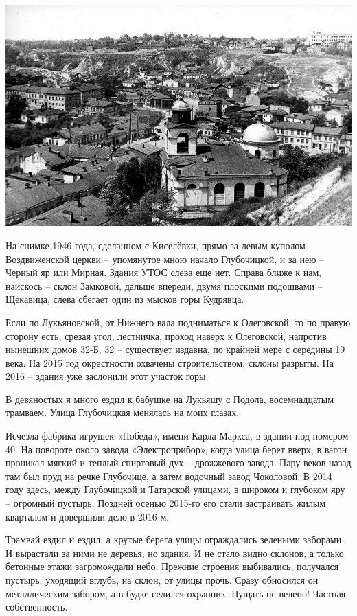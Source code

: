 \begin{center}
\includegraphics[width=0.95\linewidth]{chast-colebanie-osnov/sheka/0421_KK.jpg}
\end{center}

На снимке 1946 года, сделанном с Киселёвки, прямо за левым куполом Воздвиженской церкви – упомянутое мною начало Глубочицкой, и за нею – Черный яр или Мирная. Здания УТОС слева еще нет. Справа ближе к нам, наискось – склон Замковой, дальше впереди, двумя плоскими подошвами – Щекавица, слева сбегает один из мысков горы Кудрявца.

Если по Лукьяновской, от Нижнего вала подниматься к Олеговской, то по правую сторону есть, срезая угол, лестничка, проход наверх к Олеговской, напротив нынешних домов 32-Б, 32 – существует издавна, по крайней мере с середины 19 века. На 2015 год окрестности охвачены строительством, склоны разрыты. На 2016 – здания уже заслонили этот участок горы.

В девяностых я много ездил к бабушке на Лукьяшу с Подола, восемнадцатым трамваем. Улица Глубочицкая менялась на моих глазах.

Исчезла фабрика игрушек «Победа», имени Карла Маркса, в здании под номером 40. На повороте около завода «Электроприбор», когда улица берет вверх, в вагон проникал мягкий и теплый спиртовый дух – дрожжевого завода. Пару веков назад там был пруд на речке Глубочице, а затем водочный завод Чоколовой. В 2014 году здесь, между Глубочицкой и Татарской улицами, в широком и глубоком яру – огромный пустырь. Поздней осенью 2015-го его стали застраивать жилым кварталом и довершили дело в 2016-м.

Трамвай ездил и ездил, а крутые берега улицы ограждались зелеными заборами. И вырастали за ними не деревья, но здания. И не стало видно склонов, а только бетонные этажи загромождали небо. Прежние строения выбивались, получался пустырь, уходящий вглубь, на склон, от улицы прочь. Сразу обносился он металлическим забором, а в будке селился охранник. Пущать не велено! Частная собственность.

